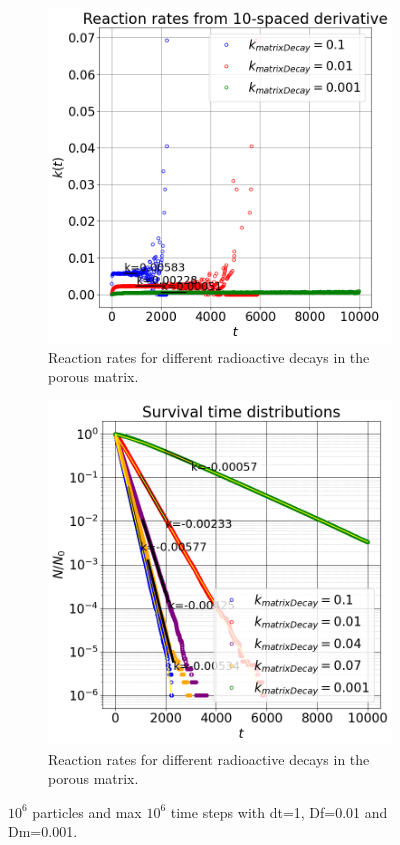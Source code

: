 \documentclass{article}
\begin{document}
\begin{figure}[htbp]
    \centering
    \begin{subfigure}[b]{0.48\textwidth}
        \centering
        \includegraphics[width=\textwidth]{images/ratesMatrixDecay.png}
        \caption{Reaction rates for different radioactive decays in the porous matrix.}
    \end{subfigure}
    \hfill
    \begin{subfigure}[b]{0.48\textwidth}
        \centering
        \includegraphics[width=\textwidth]{images/survTimeDistSemilogMatrixdecay.png}
        \caption{Reaction rates for different radioactive decays in the porous matrix.}
    \end{subfigure}
    \caption{$10^6$ particles and max $10^6$ time steps with dt=1, Df=0.01 and Dm=0.001.}
    \label{fig:reactionRatesMatrixDecay}
\end{figure}
\end{document}
